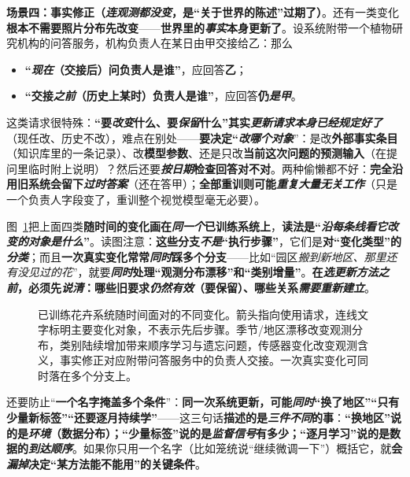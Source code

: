\textbf{场景四：事实修正（\emph{连观测都没变}，是“关于世界的陈述”过期了）}。还有一类变化\textbf{根本不需要照片分布先改变}——\textbf{世界里的\emph{事实}本身更新了}。设系统附带一个植物研究机构的问答服务，机构负责人在某日由甲交接给乙：那么
\begin{itemize}\item \textbf{“\emph{现在}（交接后）问负责人是谁”}，应回答\textbf{乙}；\item \textbf{“交接\emph{之前}（历史上某时）负责人是谁”}，应回答\textbf{仍\emph{是甲}}。\end{itemize}
这类请求很特殊：\textbf{“要\emph{改变}什么、要\emph{保留}什么”其实\emph{更新请求本身已经规定好了}}（现任改、历史不改），难点在别处——\textbf{要决定“\emph{改哪个对象}}”：是改\textbf{外部事实条目}（知识库里的一条记录）、改\textbf{模型参数}、还是只改\textbf{当前这次问题的预测输入}（在提问里临时附上说明）？然后还要\textbf{\emph{按日期}检查回答对不对}。两种偷懒都不好：\textbf{完全沿用旧系统会留下\emph{过时答案}}（还在答甲）；\textbf{全部重训则可能\emph{重复大量无关工作}}（只是一个负责人字段变了，重训整个视觉模型毫无必要）。

图~\ref{fig:ket-overview-scenarios}把上面四类\textbf{随时间的变化}\textbf{画在\emph{同一个}已训练系统上}，\textbf{读法是“\emph{沿每条线看它\emph{改变的对象}是什么}”}。读图注意：\textbf{这些分支\emph{不是}“执行步骤”}，它们是\textbf{对“变化类型”的\emph{分类}}；而且\textbf{一次真实变化常常\emph{同时}踩多个分支}——比如“园区\emph{搬到新地区、那里还有没见过的花}”，就要\textbf{\emph{同时}处理“观测分布漂移”和“类别增量”}。\textbf{在\emph{选更新方法之前}，必须先\emph{说清}：哪些旧要求\emph{仍然有效}（要保留）、哪些关系\emph{需要重新建立}}。

\begin{figure}[htbp]
  \centering
  
  \caption{已训练花卉系统随时间面对的不同变化。箭头指向使用请求，连线文字标明主要变化对象，不表示先后步骤。季节/地区漂移改变观测分布，类别陆续增加带来顺序学习与遗忘问题，传感器变化改变观测含义，事实修正对应附带问答服务中的负责人交接。一次真实变化可同时落在多个分支上。}
  \label{fig:ket-overview-scenarios}
\end{figure}

还要防止“\textbf{一个名字掩盖多个条件}”：\textbf{同一次系统更新，可能\emph{同时}“换了地区”“只有少量新标签”“还要逐月持续学”}——这三句话\textbf{描述的是\emph{三件不同}的事}：\textbf{“换地区”说的是\emph{环境}（数据分布）；“少量标签”说的是\emph{监督信号}有多少；“逐月学习”说的是数据的\emph{到达顺序}}。如果你只用一个名字（比如笼统说“继续微调一下”）概括它，就\textbf{会\emph{漏掉}决定“某方法能不能用”的关键条件}。

